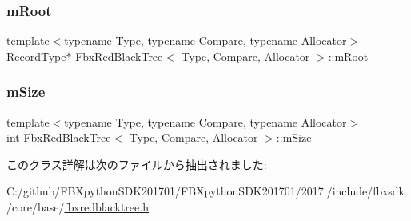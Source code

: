 \subsubsection{\texorpdfstring{m\+Root}{mRoot}}
{\footnotesize\ttfamily template$<$typename Type, typename Compare, typename Allocator$>$ \\
\hyperlink{class_fbx_red_black_tree_1_1_record_type}{Record\+Type}$\ast$ \hyperlink{class_fbx_red_black_tree}{Fbx\+Red\+Black\+Tree}$<$ Type, Compare, Allocator $>$\+::m\+Root\hspace{0.3cm}{\ttfamily [protected]}}

\mbox{\label{class_fbx_red_black_tree_a45b29bfeaffd897c186440fef29b6dfe}} 
\subsubsection{\texorpdfstring{m\+Size}{mSize}}
{\footnotesize\ttfamily template$<$typename Type, typename Compare, typename Allocator$>$ \\
int \hyperlink{class_fbx_red_black_tree}{Fbx\+Red\+Black\+Tree}$<$ Type, Compare, Allocator $>$\+::m\+Size\hspace{0.3cm}{\ttfamily [protected]}}



このクラス詳解は次のファイルから抽出されました\+:\begin{DoxyCompactItemize}
\item 
C\+:/github/\+F\+B\+Xpython\+S\+D\+K201701/\+F\+B\+Xpython\+S\+D\+K201701/2017./include/fbxsdk/core/base/\hyperlink{fbxredblacktree_8h}{fbxredblacktree.\+h}\end{DoxyCompactItemize}
